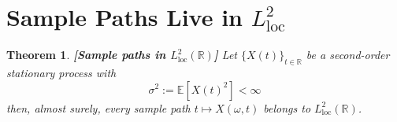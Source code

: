 \documentclass{article}
\newcommand{\assign}{:=}
\newcommand{\tmop}[1]{\ensuremath{\operatorname{#1}}}
\newcommand{\tmstrong}[1]{\textbf{#1}}
\newtheorem{theorem}{Theorem}
\begin{document}
\section{Sample Paths Live in $L^2_{\tmop{loc}}$}\label{sec:samplepaths}

\begin{theorem}
  {\tmstrong{[Sample paths in $L^2_{\tmop{loc}}
  (\mathbb{R})$]\label{thm:paths_loc}}} Let $\{X (t)\}_{t \in \mathbb{R}}$ be
  a second-order stationary process with
  \begin{equation}
    \sigma^2 \assign \mathbb{E} [X (t)^2] < \infty
  \end{equation}
  then, almost surely, every sample path $t \mapsto X (\omega, t)$ belongs to
  $L^2_{\tmop{loc}} (\mathbb{R})$.
\end{theorem}
\end{document}
